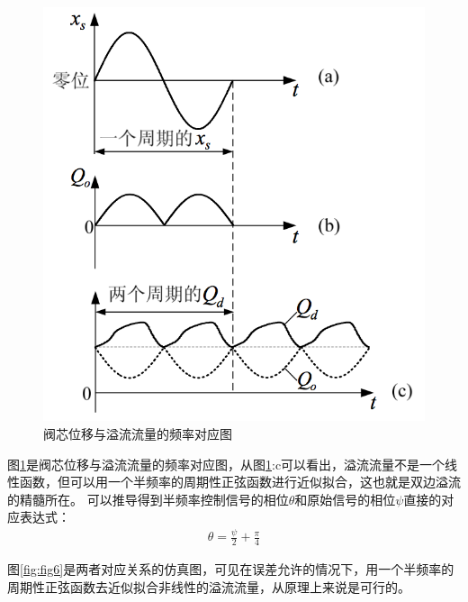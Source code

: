 \documentclass[12pt]{article}
\begin{document}
\begin{figure}[H]
\begin{center}
\includegraphics[width=0.9\linewidth]{./images/阀芯位移与溢流流量的频率对应图.png}
\caption{阀芯位移与溢流流量的频率对应图}
\label{fig:fig5}
\end{center}
\end{figure}

图\ref{fig:fig5}是阀芯位移与溢流流量的频率对应图，从图\ref{fig:fig5}:c可以看出，溢流流量不是一个线性函数，但可以用一个半频率的周期性正弦函数进行近似拟合，这也就是双边溢流的精髓所在。
可以推导得到半频率控制信号的相位$\theta$和原始信号的相位$\psi$直接的对应表达式：
\begin{align}
\theta = \frac{\psi}{2}+\frac{\pi}{4}
\end{align}

图\ref{fig:fig6}是两者对应关系的仿真图，可见在误差允许的情况下，用一个半频率的周期性正弦函数去近似拟合非线性的溢流流量，从原理上来说是可行的。
\end{document}
